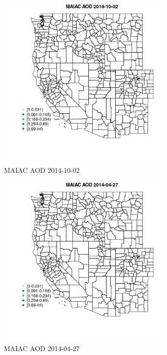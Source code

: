 \begin{figure} 
\centering  
\includegraphics[width=0.77\textwidth]{Code_Outputs/Report_ML_input_PM25_Step4_part_e_de_duplicated_aveswNAs_MapObsMAIAC_AOD2014-10-02.jpg} 
\caption{\label{fig:Report_ML_input_PM25_Step4_part_e_de_duplicated_aveswNAsMapObsMAIAC_AOD2014-10-02}MAIAC AOD 2014-10-02} 
\end{figure} 
 

\begin{figure} 
\centering  
\includegraphics[width=0.77\textwidth]{Code_Outputs/Report_ML_input_PM25_Step4_part_e_de_duplicated_aveswNAs_MapObsMAIAC_AOD2014-04-27.jpg} 
\caption{\label{fig:Report_ML_input_PM25_Step4_part_e_de_duplicated_aveswNAsMapObsMAIAC_AOD2014-04-27}MAIAC AOD 2014-04-27} 
\end{figure} 
 

